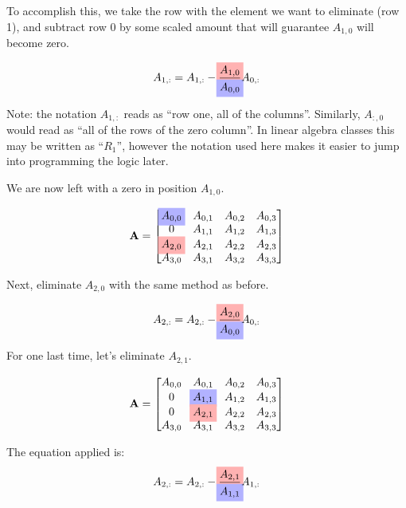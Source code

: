 \documentclass{../../KDHnotes}
\newcommand{\rhigh}[1]{%
  \ooalign{\hss\makebox[0pt]{\colorbox{red!30}{$#1$}}\hss\cr\phantom{$#1$}}%
}
\newcommand{\bhigh}[1]{%
  \ooalign{\hss\makebox[0pt]{\colorbox{blue!30}{$#1$}}\hss\cr\phantom{$#1$}}%
}
\begin{document}
To accomplish this, we take the row with the element we want to eliminate (row 1), and subtract row 0 by some scaled amount that will guarantee $A_{1,0}$ will become zero.

\begin{equation}
	A_{1,:} = A_{1, :} - \frac{
		\rhigh{A_{1,0}}
	} {
		\bhigh{A_{0,0}}
	}
	A_{0,:}
\end{equation}

Note: the notation $A_{1,:}$ reads as ``row one, all of the columns''. Similarly, $A_{:, 0}$ would read as ``all of the rows of the zero column''. In linear algebra classes this may be written as ``$R_1$'', however the notation used here makes it easier to jump into programming the logic later.


We are now left with a zero in position $A_{1,0}$.

\begin{equation}
	\vec{A} = 
	\begin{bmatrix}
		\bhigh{A_{0,0}} & A_{0,1} & A_{0,2} & A_{0,3}\\
		0 & A_{1,1} & A_{1,2} & A_{1,3}\\
		\rhigh{A_{2,0}} & A_{2,1} & A_{2,2} & A_{2,3}\\
		A_{3,0} & A_{3,1} & A_{3,2} & A_{3,3}\\
	\end{bmatrix}
\end{equation}


 Next, eliminate $A_{2,0}$ with the same method as before.

\begin{equation}
	A_{2,:} = A_{2, :} - \frac{
		\rhigh{A_{2,0}}
	} {
		\bhigh{A_{0,0}}
	}
	A_{0,:}
\end{equation}

For one last time, let's eliminate $A_{2,1}$.

\begin{equation}
	\vec{A} = 
	\begin{bmatrix}
		A_{0,0} & A_{0,1} & A_{0,2} & A_{0,3}\\
		0 & \bhigh{A_{1,1}} & A_{1,2} & A_{1,3}\\
		0 & \rhigh{A_{2,1}} & A_{2,2} & A_{2,3}\\
		A_{3,0} & A_{3,1} & A_{3,2} & A_{3,3}\\
	\end{bmatrix}
\end{equation}

The equation applied is:
\begin{equation}
	A_{2,:} = A_{2, :} - \frac{
		\rhigh{A_{2,1}}
	} {
		\bhigh{A_{1,1}}
	}
	A_{1,:}
\end{equation}
\end{document}
